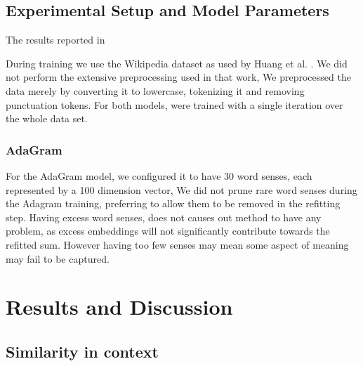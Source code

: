 \documentclass{sig-alternate}
\begin{document}
\subsection{Experimental Setup and Model Parameters}

The results reported in 


During training we use the Wikipedia dataset as used by Huang et al. \cite{Huang2012}.
We did not perform the extensive preprocessing used in that work, 
We preprocessed the data merely by converting it to lowercase, tokenizing it and removing punctuation tokens.
For both models, were trained with a single iteration over the whole data set.


\subsubsection{AdaGram}
For the AdaGram model, we configured it to have 30 word senses, each represented by a 100 dimension vector,
We did not prune rare word senses during the Adagram training, preferring to allow them to be removed in the refitting step.
Having excess word senses, does not causes out method to have any problem, as excess embeddings will not significantly contribute towards the refitted sum.
However having too few senses may mean some aspect of meaning may fail to be captured.


\begin{comment}
\end{comment}


\section{Results and Discussion} \label{results}


\subsection{Similarity in context}
\end{document}
